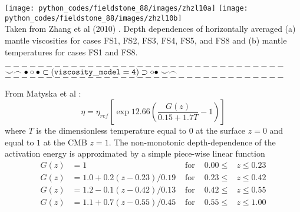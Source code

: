\begin{center}
\texttt{[image: python\_codes/fieldstone\_88/images/zhzl10a]}
\texttt{[image: python\_codes/fieldstone\_88/images/zhzl10b]}\\
{\captionfont Taken from Zhang et al (2010) \cite{zhzl10}.
Depth dependences of horizontally averaged
(a) mantle viscosities for cases FS1, FS2, FS3, FS4, FS5,
and FS8 and (b) mantle temperatures for cases FS1 and FS8.}
\end{center}

\begin{center}
$----------------------------------$\\
$\smile \frown \bullet \circ \bullet \subset ( {\tt viscosity\_model=4} ) \supset \circ \bullet \smile \frown$\\
$----------------------------------$
\end{center}

From Matyska et al \cite{mayw11}: 
\[
\eta = \eta_{ref}\left[  \exp 12.66\left(   \frac{G(z)}{0.15+1.7T}-1  \right) \right]
\]
where $T$ is the dimensionless temperature equal to $0$ at the surface
$z=0$ and equal to $1$ at the CMB $z=1$.
The non-monotonic depth-dependence of the activation energy
is approximated by a simple piece-wise linear function
\begin{align}
G(z)&=1                    & \text{ for }  &0.00\leq &z \leq 0.23 \\
G(z)&=1.0+0.2(z-0.23)/0.19 & \text{ for }  &0.23\leq &z \leq 0.42 \\
G(z)&=1.2-0.1(z-0.42)/0.13 & \text{ for }  &0.42\leq &z \leq 0.55 \\
G(z)&=1.1+0.7(z-0.55)/0.45 & \text{ for }  &0.55\leq &z \leq 1.00 
\end{align}


